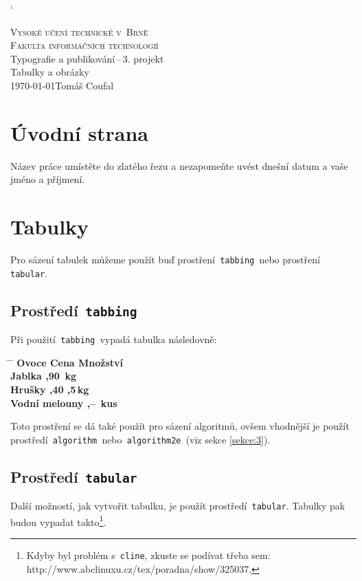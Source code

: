 \documentclass[a4paper, 11pt]{article}
\begin{document}
\catcode`
\thispagestyle{empty}
\begin{center}
  {\Huge\textsc{Vysoké učení technické v~Brně \\ }}
  {\huge\textsc{Fakulta informačních technologií \\}}
  {\LARGE{Typografie a publikování\,--\,3. projekt \\ }}
  {\Huge{Tabulky a obrázky \\}}
  {\Large \today \hfill Tomáš Coufal}
\end{center}
\newpage
\setcounter{page}{1}

\section{Úvodní strana}
Název práce umístěte do zlatého řezu a nezapomeňte uvést dnešní datum a vaše jméno a příjmení.

\section{Tabulky}
Pro sázení tabulek můžeme použít buď prostření\texttt{ tabbing }nebo prostření\texttt{ tabular}.

\subsection{Prostředí{\texttt{ tabbing}}}
Při použití\texttt{ tabbing }vypadá tabulka následovně:
\begin{tabbing}
  \hspace{2.75cm} \= \hspace{1.25cm} \= \kill
  \bfseries Ovoce \> \bfseries Cena \> \bfseries Množství \\
  Jablka ,90 \,kg \\
  Hrušky ,40 ,5\,kg \\
  Vodní melouny ,-- \,kus \\
\end{tabbing}
Toto prostření se dá také použít pro sázení algoritmů, ovšem vhodnější je použít prostředí\texttt{ algorithm }nebo\texttt{ algorithm2e }(viz sekce \ref{sekce:3}).

\subsection{Prostředí{\texttt{ tabular}}}
Další možností, jak vytvořit tabulku, je použít prostředí\texttt{ tabular}. Tabulky pak budou vypadat takto\footnote{Kdyby byl problém s\texttt{ cline}, zkuste se podívat třeba sem: http://www.abclinuxu.cz/tex/poradna/show/325037.}.
\end{document}
